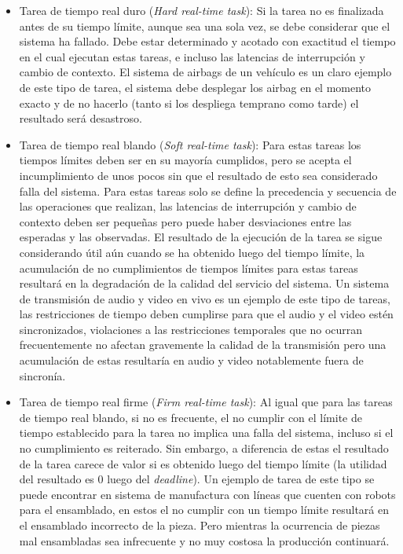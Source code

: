 \documentclass[withindex,glossary]{cam-thesis}
\begin{document}
\begin{itemize}[topsep=-11pt]
	\item Tarea de tiempo real duro (\textit{Hard real-time task}): Si la tarea no es finalizada antes de su tiempo límite, aunque sea una sola vez, se debe considerar que el sistema ha fallado. Debe estar determinado y acotado con exactitud el tiempo en el cual ejecutan estas tareas, e incluso las latencias de interrupción y cambio de contexto. El sistema de airbags de un vehículo es un claro ejemplo de este tipo de tarea, el sistema debe desplegar los airbag en el momento exacto y de no hacerlo (tanto si los despliega temprano como tarde) el resultado será desastroso.
    \item Tarea de tiempo real blando (\textit{Soft real-time task}): Para estas tareas los tiempos límites deben ser en su mayoría cumplidos, pero se acepta el incumplimiento de unos pocos sin que el resultado de esto sea considerado falla del sistema. Para estas tareas solo se define la precedencia y secuencia de las operaciones que realizan, las latencias de interrupción y cambio de contexto deben ser pequeñas pero puede haber desviaciones entre las esperadas y las observadas. El resultado de la ejecución de la tarea se sigue considerando útil aún cuando se ha obtenido luego del tiempo límite, la acumulación de no cumplimientos de tiempos límites para estas tareas resultará en la degradación de la calidad del servicio del sistema. Un sistema de transmisión de audio y video en vivo es un ejemplo de este tipo de tareas, las restricciones de tiempo deben cumplirse para que el audio y el video estén sincronizados, violaciones a las restricciones temporales que no ocurran frecuentemente no afectan gravemente la calidad de la transmisión pero una acumulación de estas resultaría en audio y video notablemente fuera de sincronía.
    \item Tarea de tiempo real firme (\textit{Firm real-time task}): Al igual que para las tareas de tiempo real blando, si no es frecuente, el no cumplir con el límite de tiempo establecido para la tarea no implica una falla del sistema, incluso si el no cumplimiento es reiterado. Sin embargo, a diferencia de estas el resultado de la tarea carece de valor si es obtenido luego del tiempo límite (la utilidad del resultado es 0 luego del \textit{deadline}). Un ejemplo de tarea de este tipo se puede encontrar en sistema de manufactura con líneas que cuenten con robots para el ensamblado, en estos el no cumplir con un tiempo límite resultará en el ensamblado incorrecto de la pieza. Pero mientras la ocurrencia de piezas mal ensambladas sea infrecuente y no muy costosa la producción continuará.
\\[-7pt]
\end{itemize}
\end{document}
